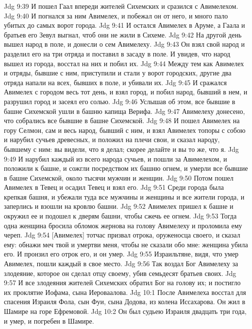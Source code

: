 \vs Jdg 9:39 И пошел Гаал впереди жителей Сихемских и сразился с Авимелехом.
\vs Jdg 9:40 И погнался за ним Авимелех, и побежал он от него, и много пало убитых до самых ворот города.
\vs Jdg 9:41 И остался Авимелех в Аруме, а Гаала и братьев его Зевул выгнал, чтоб они не жили в Сихеме.
\vs Jdg 9:42 На другой день вышел народ в поле, и донесли о сем Авимелеху.
\vs Jdg 9:43 Он взял свой народ и разделил его на три отряда и поставил в засаду в поле. И увидев, что народ вышел из города, восстал на них и побил их.
\vs Jdg 9:44 Между тем как Авимелех и отряды, бывшие с ним, приступили и стали у ворот городских, другие два отряда напали на всех, бывших в поле, и убивали их.
\vs Jdg 9:45 И сражался Авимелех с городом весь тот день, и взял город, и побил народ, бывший в нем, и разрушил город и засеял его солью.
\vs Jdg 9:46 Услышав об этом, все бывшие в башне Сихемской ушли в башню капища Верифа.
\vs Jdg 9:47 Авимелеху донесено, что собрались  все бывшие в башне Сихемской.
\vs Jdg 9:48 И пошел Авимелех на гору Селмон, сам и весь народ, бывший с ним, и взял Авимелех топоры с собою и нарубил сучьев древесных, и положил на плечи свои, и сказал народу, бывшему с ним: вы видели, что я делал; скорее делайте и вы то же, что я.
\vs Jdg 9:49 И нарубил каждый из всего народа сучьев, и пошли за Авимелехом, и положили к башне, и сожгли посредством их башню огнем, и умерли все бывшие в башне Сихемской, около тысячи мужчин и женщин.
\vs Jdg 9:50 Потом пошел Авимелех в Тевец и осадил Тевец и взял его.
\vs Jdg 9:51 Среди города была крепкая башня, и убежали туда все мужчины и женщины и все жители города, и заперлись и взошли на кровлю башни.
\vs Jdg 9:52 Авимелех пришел к башне и окружил ее и подошел к дверям башни, чтобы сжечь ее огнем.
\vs Jdg 9:53 Тогда одна женщина бросила обломок жернова на голову Авимелеху и проломила ему череп.
\vs Jdg 9:54 [Авимелех] тотчас призвал отрока, оруженосца своего, и сказал ему: обнажи меч твой и умертви меня, чтобы не сказали обо мне: женщина убила его. И пронзил его отрок его, и он умер.
\vs Jdg 9:55 Израильтяне, видя, что умер Авимелех, пошли каждый в свое место.
\vs Jdg 9:56 Так воздал Бог Авимелеху за злодеяние, которое он сделал отцу своему, убив семьдесят братьев своих.
\vs Jdg 9:57 И все злодеяния жителей Сихемских обратил Бог на голову их; и постигло их проклятие Иофама, сына Иероваалова.
\vs Jdg 10:1 После Авимелеха восстал для спасения Израиля Фола, сын Фуи, сына Додова, из колена Иссахарова. Он жил в Шамире на горе Ефремовой.
\vs Jdg 10:2 Он был судьею Израиля двадцать три года, и умер, и погребен в Шамире.
